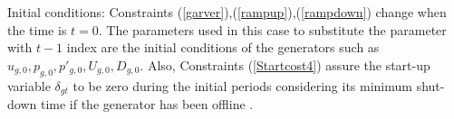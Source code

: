 Initial conditions: Constraints (\ref{garver}),(\ref{rampup}),(\ref{rampdown}) change when the time is $t=0$. The parameters used in this case to substitute the parameter with $t-1$ index are the initial conditions of the generators such as $u_{g,0}, p_{g,0}, p'_{g,0}, U_{g,0}, D_{g,0}$. Also, Constraints (\ref{Startcost4}) assure the start-up variable $\delta_{gt}$ to be zero during the initial periods considering its minimum shut-down time if the generator has been offline \citep{Morales-Espania2013}.






